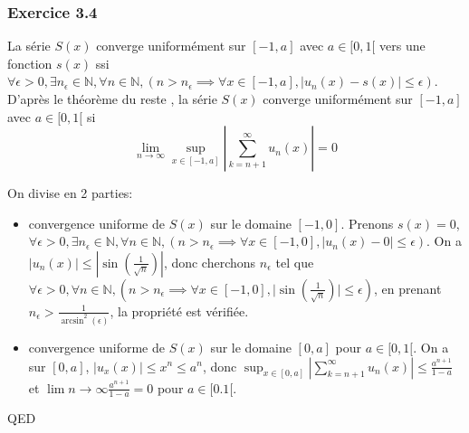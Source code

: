 \documentclass[]{book}
\theoremstyle{definition}
\newcommand{\bb}[1]{\mathbb{#1}}
\newcommand{\N}{\bb{N}}
\begin{document}
\subsubsection*{Exercice 3.4}
La s\'erie $S(x)$  converge uniform\'ement sur $[-1,a]$ avec $a \in [0,1[$ vers une fonction $s(x)$ ssi $\forall \epsilon > 0, \exists n_{\epsilon} \in \N,  \forall n \in \N, (n > n_{\epsilon} \implies \forall x \in [-1,a], \lvert u_n(x) - s(x) \rvert \le \epsilon)$. \\

D'apr\`es le th\'eor\`eme du reste , la s\'erie $S(x)$  converge uniform\'ement sur $[-1,a]$ avec $a \in [0,1[$ si 
$$
\lim_{n \to \infty}\sup_{x \in [-1,a]} \left \lvert \sum_{k = n+1}^{\infty} {u_n(x)} \right \rvert = 0
$$	

On divise en 2 parties:
\begin{itemize}
\item convergence uniforme de $S(x)$ sur le domaine $[-1,0]$. Prenons $s(x) = 0$, $\forall \epsilon > 0, \exists n_{\epsilon} \in \N,  \forall n \in \N, (n > n_{\epsilon} \implies \forall x \in [-1,0], \lvert u_n(x) - 0 \rvert \le \epsilon)$. On a $\lvert u_n(x) \rvert \le |\sin(\frac{1}{\sqrt{n}})| $, donc cherchons $n_{\epsilon}$ tel que $\forall \epsilon > 0, \forall n \in \N, (n > n_{\epsilon} \implies \forall x \in [-1,0], \lvert \sin(\frac{1}{\sqrt{n}}) \rvert \le \epsilon)$, en prenant $n_{\epsilon} > \frac{1}{\arcsin^2(\epsilon)}$, la propri\'et\'e est v\'erifi\'ee. 
\item convergence uniforme de $S(x)$ sur le domaine $[0,a]$ pour $a \in [0,1[$. On a sur $[0,a]$, $\lvert u_x(x) \rvert \le x^n \le  a^n $, donc $\sup_{x \in [0,a]} \left \lvert \sum_{k = n+1}^{\infty} {u_n(x)} \right \rvert \le \frac{a^{n+1}}{1-a}$ et $\lim{n \to \infty}{\frac{a^{n+1}}{1-a}} = 0$ pour $a \in [0.1[$.
\end{itemize}


QED
\end{document}
